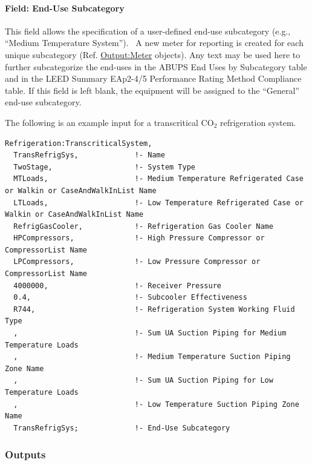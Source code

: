 \paragraph{Field: End-Use Subcategory}\label{field-end-use-subcategory-2-002}

This field allows the specification of a user-defined end-use subcategory (e.g., ``Medium Temperature System'').~ A new meter for reporting is created for each unique subcategory (Ref. \hyperref[outputmeter-and-outputmetermeterfileonly]{Output:Meter} objects). Any text may be used here to further subcategorize the end-uses in the ABUPS End Uses by Subcategory table and in the LEED Summary EAp2-4/5 Performance Rating Method Compliance table. If this field is left blank, the equipment will be assigned to the ``General'' end-use subcategory.

The following is an example input for a transcritical CO\(_{2}\) refrigeration system.

\begin{lstlisting}
Refrigeration:TranscriticalSystem,
  TransRefrigSys,             !- Name
  TwoStage,                   !- System Type
  MTLoads,                    !- Medium Temperature Refrigerated Case or Walkin or CaseAndWalkInList Name
  LTLoads,                    !- Low Temperature Refrigerated Case or Walkin or CaseAndWalkInList Name
  RefrigGasCooler,            !- Refrigeration Gas Cooler Name
  HPCompressors,              !- High Pressure Compressor or CompressorList Name
  LPCompressors,              !- Low Pressure Compressor or CompressorList Name
  4000000,                    !- Receiver Pressure
  0.4,                        !- Subcooler Effectiveness
  R744,                       !- Refrigeration System Working Fluid Type
  ,                           !- Sum UA Suction Piping for Medium Temperature Loads
  ,                           !- Medium Temperature Suction Piping Zone Name
  ,                           !- Sum UA Suction Piping for Low Temperature Loads
  ,                           !- Low Temperature Suction Piping Zone Name
  TransRefrigSys;             !- End-Use Subcategory
\end{lstlisting}

\subsubsection{Outputs}\label{outputs-3-016}

